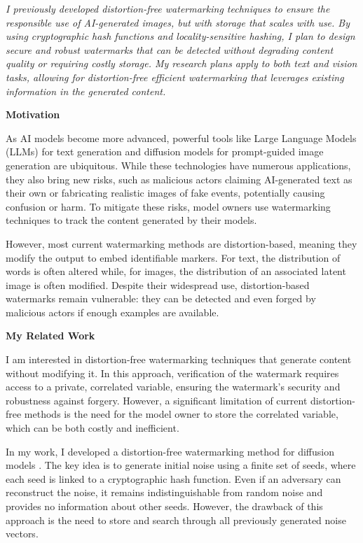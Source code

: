 \documentclass[11pt]{article}
\begin{document}
{\textit{I previously developed distortion-free watermarking techniques to ensure the responsible use of AI-generated images, but with storage that scales with use. By using cryptographic hash functions and locality-sensitive hashing, I plan to design secure and robust watermarks that can be detected without degrading content quality or requiring costly storage. My research plans apply to both text and vision tasks, allowing for distortion-free efficient watermarking that leverages existing information in the generated content.}

{ \large \textbf{Motivation}}

As AI models become more advanced, powerful tools like Large Language Models (LLMs) for text generation and diffusion models for prompt-guided image generation are ubiquitous. While these technologies have numerous applications, they also bring new risks, such as malicious actors claiming AI-generated text as their own or fabricating realistic images of fake events, potentially causing confusion or harm. To mitigate these risks, model owners use watermarking techniques to track the content generated by their models.

However, most current watermarking methods are distortion-based, meaning they modify the output to embed identifiable markers. For text, the distribution of words is often altered while, for images, the distribution of an associated latent image is often modified. Despite their widespread use, distortion-based watermarks remain vulnerable: they can be detected and even forged by malicious actors if enough examples are available.

{ \large \textbf{My Related Work}}

I am interested in distortion-free watermarking techniques that generate content without modifying it. In this approach, verification of the watermark requires access to a private, correlated variable, ensuring the watermark's security and robustness against forgery. However, a significant limitation of current distortion-free methods is the need for the model owner to store the correlated variable, which can be both costly and inefficient.

In my work, I developed a distortion-free watermarking method for diffusion models \cite{arabi2024hidden}. The key idea is to generate initial noise using a finite set of seeds, where each seed is linked to a cryptographic hash function. Even if an adversary can reconstruct the noise, it remains indistinguishable from random noise and provides no information about other seeds. However, the drawback of this approach is the need to store and search through all previously generated noise vectors.

}
\end{document}
